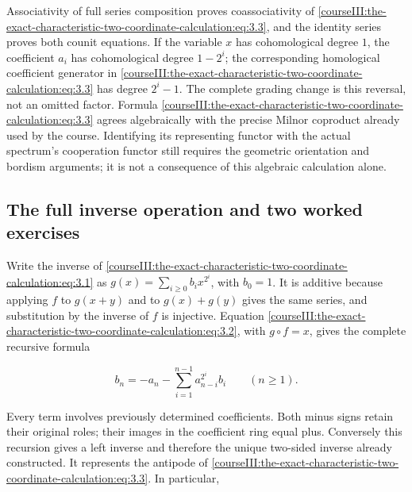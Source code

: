 Associativity of full series composition proves coassociativity of \eqref{courseIII:the-exact-characteristic-two-coordinate-calculation:eq:3.3}, and the identity series proves both counit equations. If the variable \(x\) has cohomological degree \(1\), the coefficient \(a_i\) has cohomological degree \(1-2^i\); the corresponding homological coefficient generator in \eqref{courseIII:the-exact-characteristic-two-coordinate-calculation:eq:3.3} has degree \(2^i-1\). The complete grading change is this reversal, not an omitted factor. Formula \eqref{courseIII:the-exact-characteristic-two-coordinate-calculation:eq:3.3} agrees algebraically with the precise Milnor coproduct already used by the course. Identifying its representing functor with the actual spectrum's cooperation functor still requires the geometric orientation and bordism arguments; it is not a consequence of this algebraic calculation alone.

\subsection{The full inverse operation and two worked exercises}
\label{courseIII:the-exact-characteristic-two-coordinate-calculation:formal-two-inverse-exercises}

\label{courseIII:the-exact-characteristic-two-coordinate-calculation:section-4}\label{courseIII:formal-char2:4}

Write the inverse of \eqref{courseIII:the-exact-characteristic-two-coordinate-calculation:eq:3.1} as \(g(x)=\sum_{i\geq0}b_ix^{2^i}\), with \(b_0=1\). It is additive because applying \(f\) to \(g(x+y)\) and to \(g(x)+g(y)\) gives the same series, and substitution by the inverse of \(f\) is injective. Equation \eqref{courseIII:the-exact-characteristic-two-coordinate-calculation:eq:3.2}, with \(g\circ f=x\), gives the complete recursive formula

\begin{equation}
b_n=-a_n-\sum_{i=1}^{n-1}a_{n-i}^{2^i}b_i\qquad(n\geq1).
 \label{courseIII:the-exact-characteristic-two-coordinate-calculation:eq:4.1}
\end{equation}

Every term involves previously determined coefficients. Both minus signs retain their original roles; their images in the coefficient ring equal plus. Conversely this recursion gives a left inverse and therefore the unique two-sided inverse already constructed. It represents the antipode of \eqref{courseIII:the-exact-characteristic-two-coordinate-calculation:eq:3.3}. In particular,

